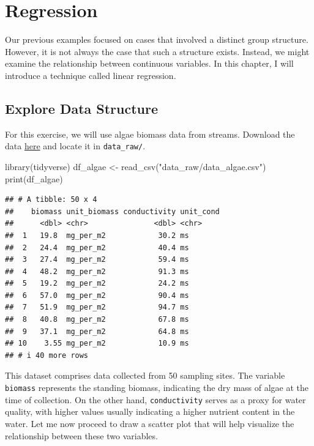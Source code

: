 \documentclass[
]{book}
\newenvironment{Shaded}{\begin{snugshade}}{\end{snugshade}}
\newcommand{\FunctionTok}[1]{\textcolor[rgb]{0.00,0.00,0.00}{#1}}
\newcommand{\NormalTok}[1]{#1}
\newcommand{\OtherTok}[1]{\textcolor[rgb]{0.56,0.35,0.01}{#1}}
\newcommand{\StringTok}[1]{\textcolor[rgb]{0.31,0.60,0.02}{#1}}
\begin{document}
\hypertarget{regression}{%
\chapter{Regression}\label{regression}}

Our previous examples focused on cases that involved a distinct group structure. However, it is not always the case that such a structure exists. Instead, we might examine the relationship between continuous variables. In this chapter, I will introduce a technique called linear regression.

\hypertarget{explore-data-structure-1}{%
\section{Explore Data Structure}\label{explore-data-structure-1}}

For this exercise, we will use algae biomass data from streams. Download the data \href{https://github.com/aterui/biostats/blob/master/data_raw/data_algae.csv}{here} and locate it in \texttt{data\_raw/}.

\begin{Shaded}
\begin{Highlighting}[]
\FunctionTok{library}\NormalTok{(tidyverse)}
\NormalTok{df\_algae }\OtherTok{\textless{}{-}} \FunctionTok{read\_csv}\NormalTok{(}\StringTok{"data\_raw/data\_algae.csv"}\NormalTok{)}
\FunctionTok{print}\NormalTok{(df\_algae)}
\end{Highlighting}
\end{Shaded}

\begin{verbatim}
## # A tibble: 50 x 4
##    biomass unit_biomass conductivity unit_cond
##      <dbl> <chr>               <dbl> <chr>    
##  1   19.8  mg_per_m2            30.2 ms       
##  2   24.4  mg_per_m2            40.4 ms       
##  3   27.4  mg_per_m2            59.4 ms       
##  4   48.2  mg_per_m2            91.3 ms       
##  5   19.2  mg_per_m2            24.2 ms       
##  6   57.0  mg_per_m2            90.4 ms       
##  7   51.9  mg_per_m2            94.7 ms       
##  8   40.8  mg_per_m2            67.8 ms       
##  9   37.1  mg_per_m2            64.8 ms       
## 10    3.55 mg_per_m2            10.9 ms       
## # i 40 more rows
\end{verbatim}

This dataset comprises data collected from 50 sampling sites. The variable \texttt{biomass} represents the standing biomass, indicating the dry mass of algae at the time of collection. On the other hand, \texttt{conductivity} serves as a proxy for water quality, with higher values usually indicating a higher nutrient content in the water. Let me now proceed to draw a scatter plot that will help visualize the relationship between these two variables.
\end{document}
